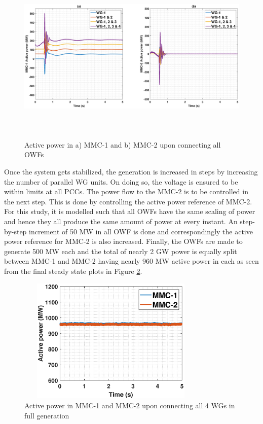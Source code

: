 \begin{figure}[H]
\hspace*{-1.7cm}
    \includegraphics[height = 8.5cm,width = 20.5cm]{Diagrams/Chapter_5/P_MMC_1_2_WT1234connect.eps}
    \caption{Active power in a) MMC-1 and b) MMC-2 upon connecting all OWFs}
    \label{P_MMC_1_2_WT1234connect}
\end{figure}

Once the system gets stabilized, the generation is increased in steps by increasing the number of parallel \gls{WG} units. On doing so, the voltage is ensured to be within limits at all \gls{PCC}s. The power flow to the \gls{MMC}-2 is to be controlled in the next step. This is done by controlling the active power reference of \gls{MMC}-2. For this study, it is modelled such that all \gls{OWF}s have the same scaling of power and hence they all produce the same amount of power at every instant. An step-by-step increment of 50 MW in all \gls{OWF} is done and correspondingly the active power reference for \gls{MMC}-2 is also increased. Finally, the \gls{OWF}s are made to generate 500 MW each and the total of nearly 2 GW power is equally split between \gls{MMC}-1 and \gls{MMC}-2 having nearly 960 MW active power in each as seen from the final steady state plots in Figure \ref{P_MMC_1_2_All_WTconnect}.

\begin{figure}[H]
\centering
    \includegraphics[height = 6cm,width = 9cm]{Diagrams/Chapter_5/P_MMC_1_2_All_WTconnect.eps}
    \caption{Active power in MMC-1 and MMC-2 upon connecting all 4 WGs in full generation}
    \label{P_MMC_1_2_All_WTconnect}
\end{figure}

